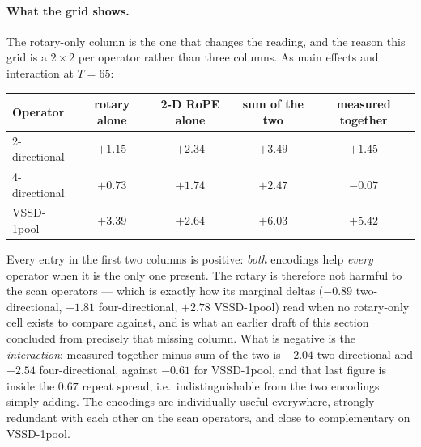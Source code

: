 \documentclass[11pt,a4paper]{article}
\begin{document}
\paragraph{What the grid shows.}
The rotary-only column is the one that changes the reading, and the reason this grid is
a $2\times2$ per operator rather than three columns. As main effects and interaction at
$T{=}65$:

\begin{center}\small
\begin{tabular}{|l|cc|cc|}
\hline
Operator & rotary alone & 2-D RoPE alone & sum of the two & measured together \\ \hline
2-directional & $+1.15$ & $+2.34$ & $+3.49$ & $+1.45$ \\ \hline
4-directional & $+0.73$ & $+1.74$ & $+2.47$ & $-0.07$ \\ \hline
VSSD-1pool & $+3.39$ & $+2.64$ & $+6.03$ & $+5.42$ \\ \hline
\end{tabular}
\end{center}

Every entry in the first two columns is positive: \emph{both} encodings help
\emph{every} operator when it is the only one present. The rotary is therefore not
harmful to the scan operators --- which is exactly how its marginal deltas ($-0.89$
two-directional, $-1.81$ four-directional, $+2.78$ VSSD-1pool) read when no
rotary-only cell exists to compare against, and is what an earlier draft of this
section concluded from precisely that missing column. What is negative is the
\emph{interaction}: measured-together minus sum-of-the-two is $-2.04$ two-directional
and $-2.54$ four-directional, against $-0.61$ for VSSD-1pool, and that last figure
is inside the $0.67$ repeat spread, i.e.\ indistinguishable from the two encodings
simply adding. The encodings are individually useful everywhere, strongly redundant
with each other on the scan operators, and close to complementary on VSSD-1pool.
\end{document}
